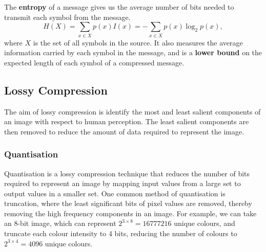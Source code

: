 \documentclass{article}
\begin{document}
\begin{definition}[Entropy]
    The \textbf{entropy} of a message gives us the average number of
    bits needed to transmit each symbol from the message.
    \begin{equation*}
        H\left( X \right) = \sum_{x \in X} p\left( x \right) I\left( x \right) = -\sum_{x \in X} p\left( x \right) \log_2{p\left( x \right)},
    \end{equation*}
    where \(X\) is the set of all symbols in the source. It also
    measures the average information carried by each symbol in the
    message, and is a \textbf{lower bound} on the expected length of
    each symbol of a compressed message.
\end{definition}
\subsection{Lossy Compression}
The aim of lossy compression is identify the most and least salient
components of an image with respect to human perception. The least
salient components are then removed to reduce the amount of data
required to represent the image.
\subsubsection{Quantisation}
Quantisation is a lossy compression technique that reduces the number
of bits required to represent an image by mapping input values from a
large set to output values in a smaller set. One common method of
quantisation is truncation, where the least significant bits of pixel
values are removed, thereby removing the high frequency components in an
image. For example, we can take an 8-bit image, which can represent
\(2^{3 \times 8} = \num{16 777 216}\) unique colours, and truncate each
colour intensity to 4 bits, reducing the number of colours to
\(2^{3 \times 4} = 4096\) unique colours.
\end{document}
